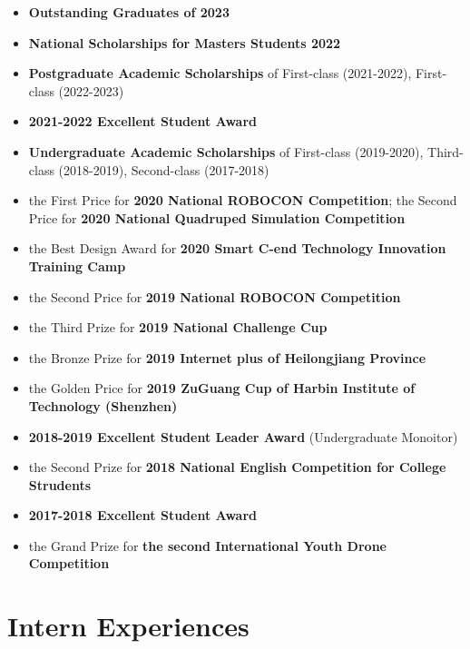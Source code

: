 \documentclass[11pt,a4paper,sans]{moderncv}        %
\begin{document}
\begin{itemize}

    \item{\textbf{Outstanding Graduates of 2023}}
    \item {\textbf{National Scholarships for Masters Students 2022}}

    \item{\textbf{Postgraduate Academic Scholarships} of First-class (2021-2022), First-class (2022-2023)}
    \item {\textbf{2021-2022 Excellent Student Award}}
    \item{\textbf{Undergraduate Academic Scholarships} of First-class (2019-2020), Third-class (2018-2019), Second-class (2017-2018)}
    
    \item{the First Price for \textbf{2020 National ROBOCON Competition}; the Second Price for \textbf{2020 National Quadruped Simulation Competition}}
    
    \item {the Best Design Award for \textbf{2020 Smart C-end Technology Innovation Training Camp}}
    
    \item{the Second Price for \textbf{2019 National ROBOCON Competition}}
    
    \item{the Third Prize for \textbf{2019 National Challenge Cup}}
    
    \item{the Bronze Prize for \textbf{2019 Internet plus of Heilongjiang Province}}
    \item{the Golden Price for \textbf{2019 ZuGuang Cup of Harbin Institute of Technology (Shenzhen)}}
    
    \item {\textbf{2018-2019 Excellent Student Leader Award} (Undergraduate Monoitor)}
    
    \item{the Second Prize for \textbf{2018 National English Competition for College Strudents}}
    \item {\textbf{2017-2018 Excellent Student Award}}
    
    \item{the Grand Prize for \textbf{the second International Youth Drone Competition}}
\end{itemize}

\section{Intern Experiences}
\end{document}
